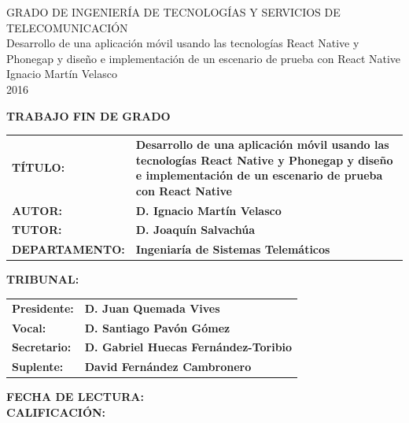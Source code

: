 \documentclass[11pt,a4paper]{report}
\newcommand\blankpage{%
	\null
	\thispagestyle{empty}%
	\newpage}
\begin{document}
\begin{titlepage}
\centering
\vspace*{\fill}
\huge{GRADO DE INGENIERÍA DE TECNOLOGÍAS Y SERVICIOS DE TELECOMUNICACIÓN}\\
\vspace*{\fill}
\huge{Desarrollo de una aplicación móvil usando las tecnologías React Native y Phonegap y diseño e implementación de un escenario de prueba con React Native}\\
\vspace*{\fill}
\huge{Ignacio Martín Velasco}\\
\huge{2016}\\
\vspace*{\fill}
\afterpage{\blankpage}
\end{titlepage}
\vspace*{10mm}
\textbf{\large{TRABAJO FIN DE GRADO}\\}
\begin{table}[H]
	\label{my-label}
	\begin{tabular}{lp{10cm}}
		\textbf{TÍTULO:}       & \textbf{Desarrollo de una aplicación móvil usando las tecnologías React Native y Phonegap y diseño e implementación de un escenario de prueba con React Native} \\[2mm]
		\textbf{AUTOR:}        & \textbf{D. Ignacio Martín Velasco}\\[2mm]
		\textbf{TUTOR:}        & \textbf{D. Joaquín Salvachúa}\\[2mm]
		\textbf{DEPARTAMENTO:} & \textbf{Ingeniaría de Sistemas Telemáticos}                                                                                                                     
	\end{tabular}
\end{table}
\vspace*{\fill}
\textbf{\large{TRIBUNAL:  }\\}
\begin{table}[H]
	\label{my-label2}
	\begin{tabular}{lp{12cm}}
		\textbf{Presidente:}       & \textbf{D. Juan Quemada Vives} \\[2mm]
		\textbf{Vocal:} & \textbf{D. Santiago Pavón Gómez}\\[2mm]
		\textbf{Secretario:} & \textbf{D. Gabriel Huecas Fernández-Toribio}\\[2mm]
		\textbf{Suplente:} & \textbf{David Fernández Cambronero}
	\end{tabular}
\end{table}
\vspace*{\fill}
\textbf{\large{FECHA DE LECTURA:\,\,\,\hrulefill}\\[15mm]}
\textbf{\large{CALIFICACIÓN:\,\,\,\hrulefill}\\}
\vspace*{\fill}
\afterpage{\blankpage}
\end{document}

